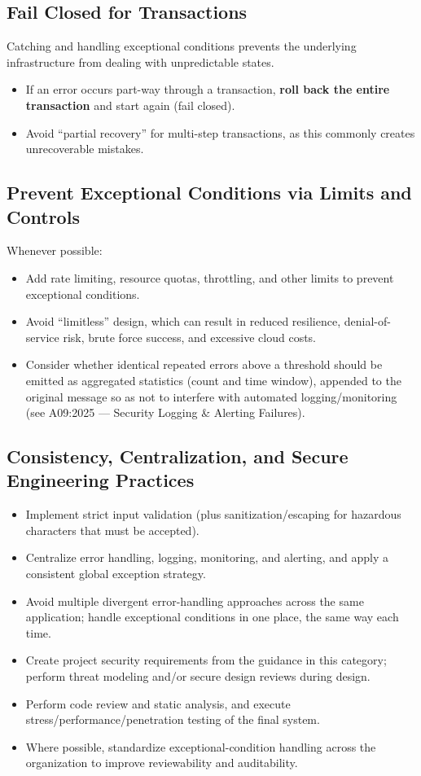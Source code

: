 \documentclass[11pt]{article}
\begin{document}
\subsection{Fail Closed for Transactions}
Catching and handling exceptional conditions prevents the underlying infrastructure from dealing with unpredictable states.

\begin{itemize}
  \item If an error occurs part-way through a transaction, \textbf{roll back the entire transaction} and start again (fail closed).
  \item Avoid ``partial recovery'' for multi-step transactions, as this commonly creates unrecoverable mistakes.
\end{itemize}

\subsection{Prevent Exceptional Conditions via Limits and Controls}
Whenever possible:
\begin{itemize}
  \item Add rate limiting, resource quotas, throttling, and other limits to prevent exceptional conditions.
  \item Avoid ``limitless'' design, which can result in reduced resilience, denial-of-service risk, brute force success, and excessive cloud costs.
  \item Consider whether identical repeated errors above a threshold should be emitted as aggregated statistics (count and time window), appended to the original message so as not to interfere with automated logging/monitoring (see A09:2025 --- Security Logging \& Alerting Failures).
\end{itemize}

\subsection{Consistency, Centralization, and Secure Engineering Practices}
\begin{itemize}
  \item Implement strict input validation (plus sanitization/escaping for hazardous characters that must be accepted).
  \item Centralize error handling, logging, monitoring, and alerting, and apply a consistent global exception strategy.
  \item Avoid multiple divergent error-handling approaches across the same application; handle exceptional conditions in one place, the same way each time.
  \item Create project security requirements from the guidance in this category; perform threat modeling and/or secure design reviews during design.
  \item Perform code review and static analysis, and execute stress/performance/penetration testing of the final system.
  \item Where possible, standardize exceptional-condition handling across the organization to improve reviewability and auditability.
\end{itemize}
\end{document}

